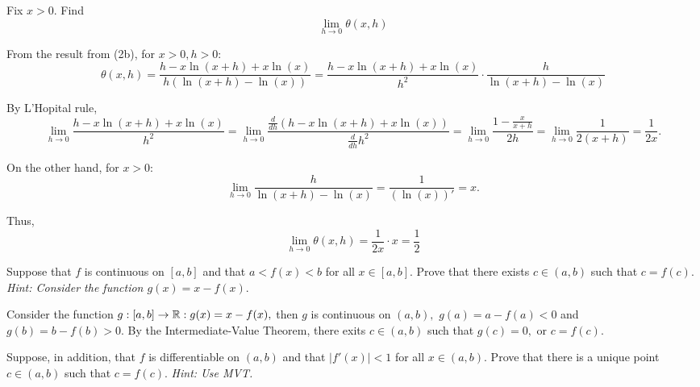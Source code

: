 \documentclass{article}
\begin{document}
\newpage

\begin{problem*}[2c]
    Fix $x >0.$ Find
    \[
        \lim_{h \rightarrow 0} \theta(x,h)
    \]
\end{problem*}

\begin{soln}
    From the result from (2b), for $x > 0, h > 0:$ 
    \[
        \theta(x,h) = \frac{h - x \ln(x+h) + x \ln(x)}{h(\ln(x+h) - \ln(x))} = \frac{ h - x \ln(x+h) + x \ln(x) }{h^2} \cdot \frac{h}{\ln(x+h) - \ln(x)}
    \]

    By L'Hopital rule,
    \[
        \lim_{h \rightarrow 0} \frac{ h - x \ln(x+h) + x \ln(x) }{h^2} = \lim_{h \rightarrow 0 } \frac{\frac{d}{dh} (h - x \ln(x+h) + x \ln(x))}{\frac{d}{dh} h^2}
        = \lim_{h \rightarrow 0 } \frac{1 - \frac{x}{x+h}}{2h} = \lim_{h \rightarrow 0 } \frac{1}{2(x+h)} = \frac{1}{2x}.
    \]

    On the other hand, for $x >0:$
    \[
        \lim_{h \rightarrow 0} \frac{h}{\ln(x+h) - \ln(x)} = \frac{1}{(\ln (x))'} = x.
    \]

    Thus,
    \[
        \lim_{h \rightarrow 0} \theta(x,h) = \frac{1}{2x} \cdot x = \boxed{\frac{1}{2}}
    \]
\end{soln}

\newpage

\begin{problem*}[3a]
    Suppose that $f$ is continuous on $[a,b]$ and that $a < f(x) < b$ for all $x \in [a,b].$
    Prove that there exists $c \in (a, b)$ such that $c = f(c).$ 
    \textit{Hint: Consider the function $g(x) = x - f (x).$}
\end{problem*}

\begin{soln}
    Consider the function $g: [a,b] \rightarrow \mathbb R: g(x) = x - f(x),$
    then $g$ is continuous on $(a,b),$ $g(a) = a - f(a) < 0$ and $g(b) = b - f(b) > 0.$
    By the Intermediate-Value Theorem, there exits $c \in (a,b)$ such that $g(c) = 0,$ or $\boxed{c = f(c).}$
\end{soln}

\bigbreak

\begin{problem*}[3b]
    Suppose, in addition, that $f$ is differentiable on $(a,b)$ and that $|f'(x)| < 1$ for all $x \in (a,b).$
    Prove that there is a unique point $c \in (a, b)$ such that $c = f(c).$
    \textit{Hint: Use MVT.}
\end{problem*}
\end{document}
